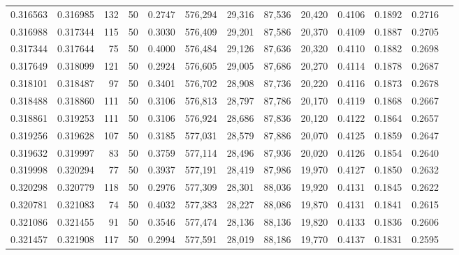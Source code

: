 \begin{tabular}{rrrrrrrrrrrrr}
0.316563 & 0.316985 &   132 &  50 &                                     0.2747 & 576,294 &  29,316 &  87,536 &  20,420 & 0.4106 & 0.1892 & 0.2716 \\
0.316988 & 0.317344 &   115 &  50 &                                     0.3030 & 576,409 &  29,201 &  87,586 &  20,370 & 0.4109 & 0.1887 & 0.2705 \\
0.317344 & 0.317644 &    75 &  50 &                                     0.4000 & 576,484 &  29,126 &  87,636 &  20,320 & 0.4110 & 0.1882 & 0.2698 \\
0.317649 & 0.318099 &   121 &  50 &                                     0.2924 & 576,605 &  29,005 &  87,686 &  20,270 & 0.4114 & 0.1878 & 0.2687 \\
0.318101 & 0.318487 &    97 &  50 &                                     0.3401 & 576,702 &  28,908 &  87,736 &  20,220 & 0.4116 & 0.1873 & 0.2678 \\
0.318488 & 0.318860 &   111 &  50 &                                     0.3106 & 576,813 &  28,797 &  87,786 &  20,170 & 0.4119 & 0.1868 & 0.2667 \\
0.318861 & 0.319253 &   111 &  50 &                                     0.3106 & 576,924 &  28,686 &  87,836 &  20,120 & 0.4122 & 0.1864 & 0.2657 \\
0.319256 & 0.319628 &   107 &  50 &                                     0.3185 & 577,031 &  28,579 &  87,886 &  20,070 & 0.4125 & 0.1859 & 0.2647 \\
0.319632 & 0.319997 &    83 &  50 &                                     0.3759 & 577,114 &  28,496 &  87,936 &  20,020 & 0.4126 & 0.1854 & 0.2640 \\
0.319998 & 0.320294 &    77 &  50 &                                     0.3937 & 577,191 &  28,419 &  87,986 &  19,970 & 0.4127 & 0.1850 & 0.2632 \\
0.320298 & 0.320779 &   118 &  50 &                                     0.2976 & 577,309 &  28,301 &  88,036 &  19,920 & 0.4131 & 0.1845 & 0.2622 \\
0.320781 & 0.321083 &    74 &  50 &                                     0.4032 & 577,383 &  28,227 &  88,086 &  19,870 & 0.4131 & 0.1841 & 0.2615 \\
0.321086 & 0.321455 &    91 &  50 &                                     0.3546 & 577,474 &  28,136 &  88,136 &  19,820 & 0.4133 & 0.1836 & 0.2606 \\
0.321457 & 0.321908 &   117 &  50 &                                     0.2994 & 577,591 &  28,019 &  88,186 &  19,770 & 0.4137 & 0.1831 & 0.2595 \\

\end{tabular}
